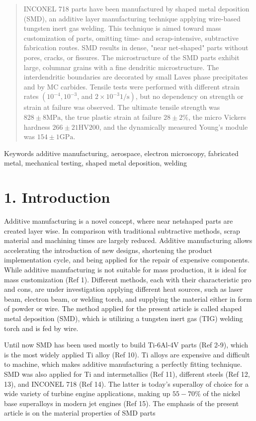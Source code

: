 \documentclass[10pt]{article}
\begin{document}
\begin{abstract}
INCONEL 718 parts have been manufactured by shaped metal deposition (SMD), an additive layer manufacturing technique applying wire-based tungsten inert gas welding. This technique is aimed toward mass customization of parts, omitting time- and scrap-intensive, subtractive fabrication routes. SMD results in dense, "near net-shaped" parts without pores, cracks, or fissures. The microstructure of the SMD parts exhibit large, columnar grains with a fine dendritic microstructure. The interdendritic boundaries are decorated by small Laves phase precipitates and by MC carbides. Tensile tests were performed with different strain rates $\left(10^{-4}, 10^{-3}\right.$, and $\left.2 \times 10^{-3} 1 / \mathrm{s}\right)$, but no dependency on strength or strain at failure was observed. The ultimate tensile strength was $828 \pm 8 \mathrm{MPa}$, the true plastic strain at failure $28 \pm 2 \%$, the micro Vickers hardness $266 \pm 21 \mathrm{HV200}$, and the dynamically measured Young's module was $154 \pm 1 \mathrm{GPa}$.
\end{abstract}

Keywords additive manufacturing, aerospace, electron microscopy, fabricated metal, mechanical testing, shaped metal deposition, welding

\section*{1. Introduction}
Additive manufacturing is a novel concept, where near netshaped parts are created layer wise. In comparison with traditional subtractive methods, scrap material and machining times are largely reduced. Additive manufacturing allows accelerating the introduction of new designs, shortening the product implementation cycle, and being applied for the repair of expensive components. While additive manufacturing is not suitable for mass production, it is ideal for mass customization (Ref 1). Different methods, each with their characteristic pro and cons, are under investigation applying different heat sources, such as laser beam, electron beam, or welding torch, and supplying the material either in form of powder or wire. The method applied for the present article is called shaped metal deposition (SMD), which is utilizing a tungsten inert gas (TIG) welding torch and is fed by wire.

Until now SMD has been used mostly to build Ti-6Al-4V parts (Ref 2-9), which is the most widely applied Ti alloy (Ref 10). Ti alloys are expensive and difficult to machine, which makes additive manufacturing a perfectly fitting technique. SMD was also applied for Ti and intermetallics (Ref 11), different steels (Ref 12, 13), and INCONEL 718 (Ref 14). The latter is today's superalloy of choice for a wide variety of turbine engine applications, making up $55-70 \%$ of the nickel base superalloys in modern jet engines (Ref 15). The emphasis of the present article is on the material properties of SMD parts
\end{document}
